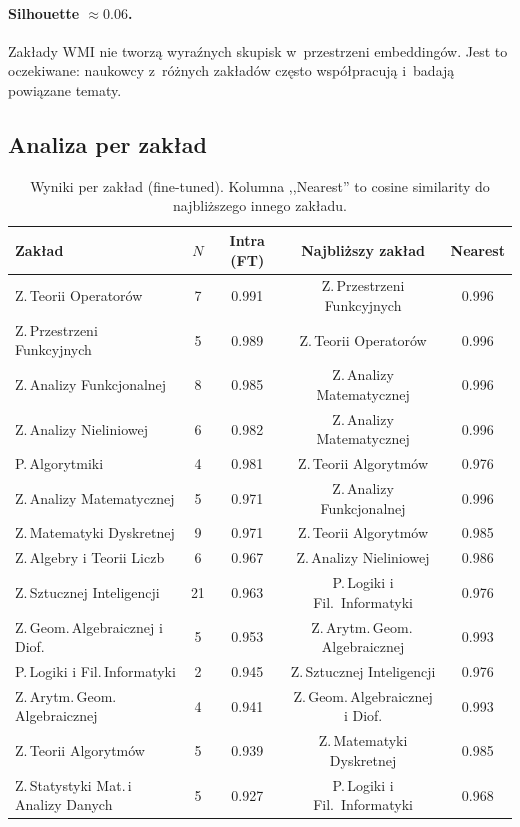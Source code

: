 \documentclass[a4paper,11pt]{article}
\begin{document}
\paragraph{Silhouette $\approx 0.06$.}
Zakłady WMI nie tworzą wyraźnych skupisk w~przestrzeni embeddingów.
Jest to oczekiwane: naukowcy z~różnych zakładów często współpracują i~badają powiązane tematy.

\subsection{Analiza per zakład}

\begin{table}[H]
\centering
\small
\caption{Wyniki per zakład (fine-tuned). Kolumna ,,Nearest'' to cosine similarity do najbliższego innego zakładu.}
\label{tab:dept_detail}
\begin{tabular}{lcccc}
\toprule
Zakład & $N$ & Intra (FT) & Najbliższy zakład & Nearest \\
\midrule
Z.\,Teorii Operatorów & 7 & 0.991 & Z.\,Przestrzeni Funkcyjnych & 0.996 \\
Z.\,Przestrzeni Funkcyjnych & 5 & 0.989 & Z.\,Teorii Operatorów & 0.996 \\
Z.\,Analizy Funkcjonalnej & 8 & 0.985 & Z.\,Analizy Matematycznej & 0.996 \\
Z.\,Analizy Nieliniowej & 6 & 0.982 & Z.\,Analizy Matematycznej & 0.996 \\
P.\,Algorytmiki & 4 & 0.981 & Z.\,Teorii Algorytmów & 0.976 \\
Z.\,Analizy Matematycznej & 5 & 0.971 & Z.\,Analizy Funkcjonalnej & 0.996 \\
Z.\,Matematyki Dyskretnej & 9 & 0.971 & Z.\,Teorii Algorytmów & 0.985 \\
Z.\,Algebry i Teorii Liczb & 6 & 0.967 & Z.\,Analizy Nieliniowej & 0.986 \\
Z.\,Sztucznej Inteligencji & 21 & 0.963 & P.\,Logiki i Fil.\ Informatyki & 0.976 \\
Z.\,Geom.\,Algebraicznej i Diof. & 5 & 0.953 & Z.\,Arytm.\,Geom.\,Algebraicznej & 0.993 \\
P.\,Logiki i Fil.\,Informatyki & 2 & 0.945 & Z.\,Sztucznej Inteligencji & 0.976 \\
Z.\,Arytm.\,Geom.\,Algebraicznej & 4 & 0.941 & Z.\,Geom.\,Algebraicznej i Diof. & 0.993 \\
Z.\,Teorii Algorytmów & 5 & 0.939 & Z.\,Matematyki Dyskretnej & 0.985 \\
Z.\,Statystyki Mat.\,i Analizy Danych & 5 & 0.927 & P.\,Logiki i Fil.\ Informatyki & 0.968 \\
\bottomrule
\end{tabular}
\end{table}
\end{document}
